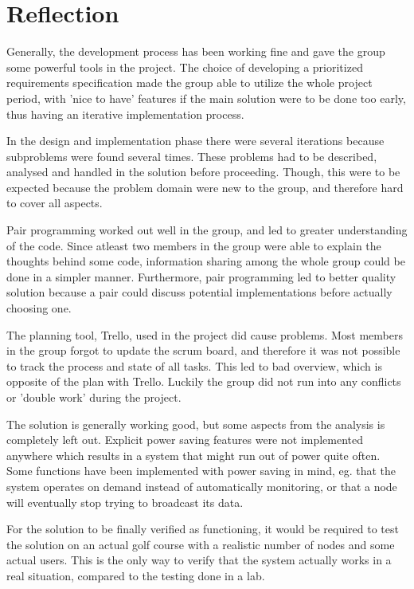 \section{Reflection}
Generally, the development process has been working fine and gave the group some powerful tools in the project. The choice of developing a prioritized requirements specification made the group able to utilize the whole project period, with 'nice to have' features if the main solution were to be done too early, thus having an iterative implementation process.

In the design and implementation phase there were several iterations because subproblems were found several times. These problems had to be described, analysed and handled in the solution before proceeding. Though, this were to be expected because the problem domain were new to the group, and therefore hard to cover all aspects.

Pair programming worked out well in the group, and led to greater understanding of the code. Since atleast two members in the group were able to explain the thoughts behind some code, information sharing among the whole group could be done in a simpler manner. Furthermore, pair programming led to better quality solution because a pair could discuss potential implementations before actually choosing one.

The planning tool, Trello, used in the project did cause problems. Most members in the group forgot to update the scrum board, and therefore it was not possible to track the process and state of all tasks. This led to bad overview, which is opposite of the plan with Trello. Luckily the group did not run into any conflicts or 'double work' during the project.

The solution is generally working good, but some aspects from the analysis is completely left out. Explicit power saving features were not implemented anywhere which results in a system that might run out of power quite often. Some functions have been implemented with power saving in mind, eg. that the system operates on demand instead of automatically monitoring, or that a node will eventually stop trying to broadcast its data.

For the solution to be finally verified as functioning, it would be required to test the solution on an actual golf course with a realistic number of nodes and some actual users. This is the only way to verify that the system actually works in a real situation, compared to the testing done in a lab.